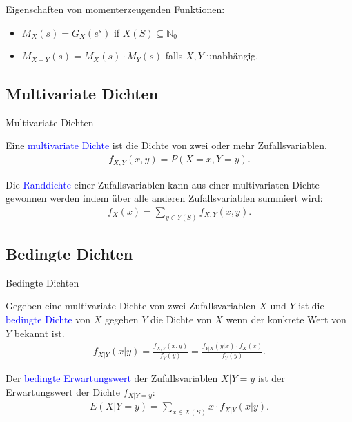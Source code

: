 \documentclass{beamer}
\def\spadding{\vspace{0.25cm}}
\def\b{\textcolor{blue}}
\begin{document}
\begin{frame}
    Eigenschaften von momenterzeugenden Funktionen:\pause
    \begin{itemize}
        \item $M_X(s) = G_X(e^s)$ if $X(S) \subseteq \mathbb{N}_0$ \pause
        \item $M_{X + Y}(s) = M_X(s) \cdot M_Y(s)$ falls $X,Y$ unabhängig.
    \end{itemize}
\end{frame}

\subsection{Multivariate Dichten}
\begin{frame}{Multivariate Dichten}
    \begin{definition}
        Eine \b{multivariate Dichte} ist die Dichte von zwei oder mehr Zufallsvariablen.
        \begin{align*}
            f_{X,Y}(x,y) = P(X = x, Y = y).
        \end{align*}\pause\par\spadding
        Die \b{Randdichte} einer Zufallsvariablen kann aus einer multivariaten Dichte gewonnen werden indem über alle anderen Zufallsvariablen summiert wird:
        \begin{align*}
            f_X(x) = \sum_{y \in Y(S)} f_{X,Y}(x,y).
        \end{align*}
    \end{definition}
\end{frame}

\subsection{Bedingte Dichten}
\begin{frame}{Bedingte Dichten}
    \begin{definition}
        Gegeben eine multivariate Dichte von zwei Zufallsvariablen $X$ und $Y$ ist die \b{bedingte Dichte} von $X$ gegeben $Y$ die Dichte von $X$ wenn der konkrete Wert von $Y$ bekannt ist.
        \begin{align*}
            f_{X|Y}(x|y) = \frac{f_{X,Y}(x,y)}{f_Y(y)} = \frac{f_{Y|X}(y|x) \cdot f_X(x)}{f_Y(y)}.
        \end{align*}\pause\par\spadding
        Der \b{bedingte Erwartungswert} der Zufallsvariablen $X|Y=y$ ist der Erwartungswert der Dichte $f_{X|Y=y}$:
        \begin{align*}
            E(X|Y=y) = \sum_{x \in X(S)} x \cdot f_{X|Y}(x|y).
        \end{align*}
    \end{definition}
\end{frame}
\end{document}
